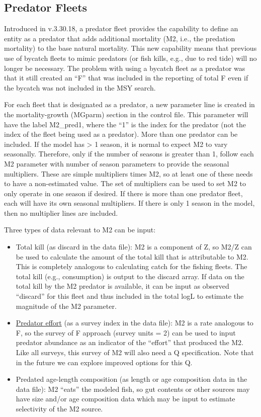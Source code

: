 \subsection{Predator Fleets}

Introduced in v.3.30.18, a predator fleet provides the capability to define an entity as a predator that adds additional mortality (M2, i.e., the predation mortality) to the base natural mortality. This new capability means that previous use of bycatch fleets to mimic predators (or fish kills, e.g., due to red tide) will no longer be necessary. The problem with using a bycatch fleet as a predator was that it still created an ``F'' that was included in the reporting of total F even if the bycatch was not included in the MSY search.

For each fleet that is designated as a predator, a new parameter line is created in the mortality-growth (MGparm) section in the control file. This parameter will have the label M2\_pred1, where the ``1'' is the index for the predator (not the index of the fleet being used as a predator). More than one predator can be included. If the model has > 1 season, it is normal to expect M2 to vary seasonally. Therefore, only if the number of seasons is greater than 1, follow each M2 parameter with number of season parameters to provide the seasonal multipliers. These are simple multipliers times M2, so at least one of these needs to have a non-estimated value. The set of multipliers can be used to set M2 to only operate in one season if desired. If there is more than one predator fleet, each will have its own seasonal multipliers. If there is only 1 season in the model, then no multiplier lines are included.

Three types of data relevant to M2 can be input:

\begin{itemize}
	\item Total kill (as discard in the data file): M2 is a component of Z, so M2/Z can be used to calculate the amount of the total kill that is attributable to M2. This is completely analogous to calculating catch for the fishing fleets. The total kill (e.g., consumption) is output to the discard array. If data on the total kill by the M2 predator is available, it can be input as observed ``discard'' for this fleet and thus included in the total logL to estimate the magnitude of the M2 parameter.
	
	\item \hyperlink{PredEffort}{Predator effort} (as a survey index in the data file): M2 is a rate analogous to F, so the survey of F approach (survey units = 2) can be used to input predator abundance as an indicator of the ``effort'' that produced the M2. Like all surveys, this survey of M2 will also need a Q specification. Note that in the future we can explore improved options for this Q.
	
	\item Predated age-length composition (as length or age composition data in the data file): M2 ``eats'' the modeled fish, so gut contents or other sources may have size and/or age composition data which may be input to estimate selectivity of the M2 source. 
\end{itemize}

